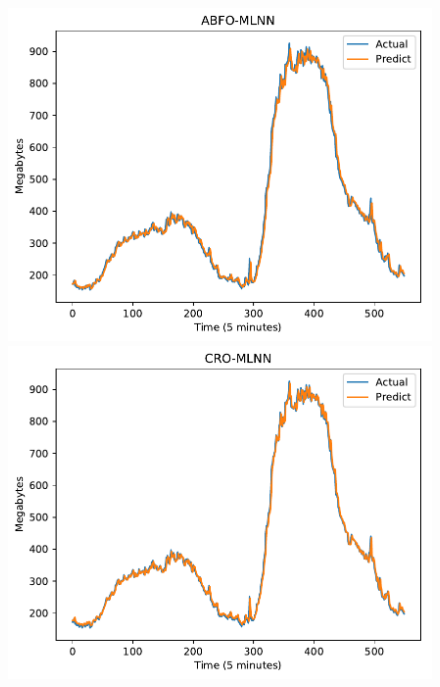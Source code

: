 \documentclass[11pt,twoside]{article}
\begin{document}
\begin{multicols}{2}
\begin{figure}[!ht]
\begin{minipage}[b]{0.33\linewidth}
  \end{minipage} 
  
   \begin{minipage}[b]{0.33\linewidth}
    \centering
    \includegraphics[width=0.9\linewidth]{predict/k2/eu_k2_abfo_mlnn.pdf} 
  \end{minipage}
  \begin{minipage}[b]{0.33\linewidth}
    \centering
    \includegraphics[width=0.9\linewidth]{predict/k2/eu_k2_cro_mlnn.pdf} 
  \end{minipage} 
  \begin{minipage}[b]{0.33\linewidth}
    \centering

\end{minipage}
\end{figure}
\end{multicols}
\end{document}
